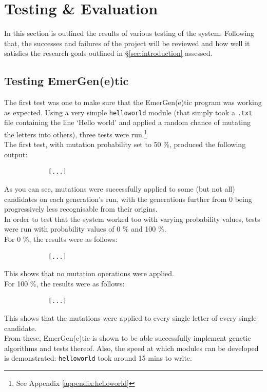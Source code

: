 \documentclass[compsoc,12pt,a4paper]{IEEEtran}
\begin{document}
	\newpage
		
	\section{Testing \& Evaluation}
	\label{sec:testing}
	
		In this section is outlined the results of various testing of the system. Following that, the successes and failures of the project will be reviewed and how well it satisfies the research goals outlined in \S \ref{sec:introduction} assessed.
		
		\subsection{Testing EmerGen(e)tic}
		
			The first test was one to make sure that the EmerGen(e)tic program was working as expected. Using a very simple \lstinline|helloworld| module (that simply took a \lstinline|.txt| file containing the line `Hello world' and applied a random chance of mutating the letters into others), three tests were run.\footnote{See Appendix \ref{appendix:helloworld}}\\
			The first test, with mutation probability set to 50 \%, produced the following output:
			
			\begin{lstlisting}
			[...]
			\end{lstlisting}
			
			As you can see, mutations were successfully applied to some (but not all) candidates on each generation's run, with the generations further from 0 being progressively less recognisable from their origins.\\
			In order to test that the system worked too with varying probability values, tests were run with probability values of 0 \% and 100 \%.\\
			For 0 \%, the results were as follows:
			
			\begin{lstlisting}
			[...]
			\end{lstlisting}
			
			This shows that no mutation operations were applied.\\
			For 100 \%, the results were as follows:
			
			\begin{lstlisting}
			[...]
			\end{lstlisting}
			
			This shows that the mutations were applied to every single letter of every single candidate.\\
			From these, EmerGen(e)tic is shown to be able successfully implement genetic algorithms and tests thereof. Also, the speed at which modules can be developed is demonstrated: \lstinline|helloworld| took around 15 mins to write.\\
		
\end{document}
